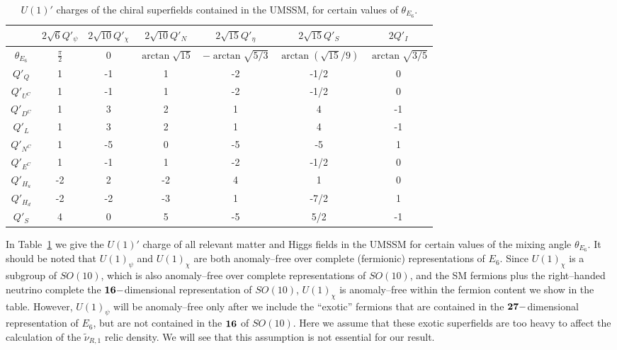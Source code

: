 \documentclass[a4paper,11pt]{article}
\begin{document}
\begin{table}[h]
\begin{center}
\begin{tabular}{ |c|c|c|c|c|c|c| }  
\hline
 & {$2\sqrt{6} Q'_\psi$} & {$2\sqrt{10} Q'_\chi$} & {$2\sqrt{10} Q'_N$} & 
{$2\sqrt{15} Q'_\eta$} & {$2\sqrt{15} Q'_S$} & {$2 Q'_I$}  \\ 
    \hline
$\theta_{E_6}$  & $\frac{\pi}{2}$ & 0 & $\arctan\sqrt{15}$ & 
$-\arctan\sqrt{5/3}$ & $\arctan(\sqrt{15}/9)$ & $\arctan\sqrt{3/5}$  \\ 
\hline
    $Q'_Q$  & 1  & -1 & 1  & -2 & -1/2 & 0    \\
    $Q'_{U^C}$  & 1  & -1 & 1  & -2 & -1/2 & 0   \\
    $Q'_{D^C}$  & 1  & 3 & 2  & 1 & 4  & -1      \\ 
    $Q'_L$  & 1   & 3 & 2   & 1 & 4 & -1  \\
    $Q'_{N^C}$  & 1  & -5 & 0  & -5 & -5 & 1     \\
    $Q'_{E^C}$  & 1  & -1 & 1  & -2 & -1/2 & 0    \\
    $Q'_{H_u}$  & -2  & 2 & -2  & 4 & 1  & 0      \\ 
    $Q'_{H_d}$  & -2  & -2 & -3  & 1 & -7/2 & 1   \\
    $Q'_S$ & 4   & 0 & 5   & -5 & 5/2 & -1    \\
\hline
\end{tabular}
\caption{$U(1)'$ charges of the chiral superfields contained in the UMSSM, 
for certain values of $\theta_{E_6}$.}
\label{T1}
\end{center}
\end{table}

In Table~\ref{T1} we give the $U(1)'$ charge of all relevant matter
and Higgs fields in the UMSSM for certain values of the mixing angle
$\theta_{E_6}$. It should be noted that $U(1)_\psi$ and $U(1)_\chi$
are both anomaly--free over complete (fermionic) representations of
$E_6$. Since $U(1)_\chi$ is a subgroup of $SO(10)$, which is also
anomaly--free over complete representations of $SO(10)$, and the SM
fermions plus the right--handed neutrino complete the
${\bf 16}-$dimensional representation of $SO(10)$, $U(1)_\chi$ is
anomaly--free within the fermion content we show in the
table. However, $U(1)_\psi$ will be anomaly--free only after we
include the ``exotic'' fermions that are contained in the
${\bf 27}-$dimensional representation of $E_6$, but are not contained
in the ${\bf 16}$ of $SO(10)$. Here we assume that these exotic
superfields are too heavy to affect the calculation of the
$\tilde \nu_{R,1}$ relic density. We will see that this assumption is
not essential for our result.
\end{document}

